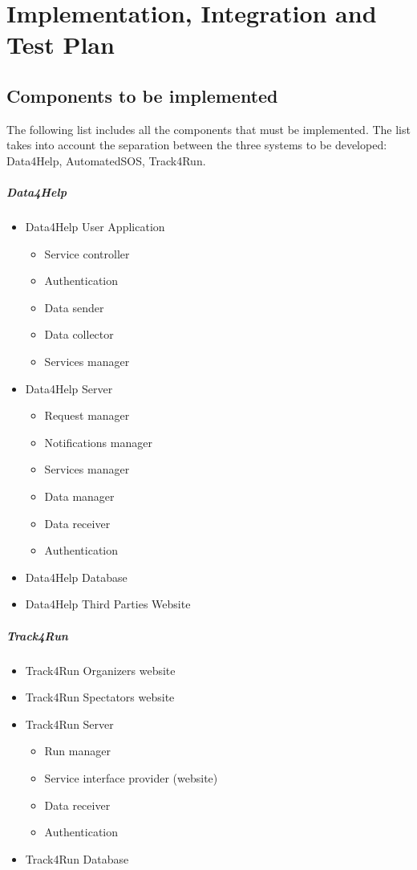 \documentclass[../DD.tex]{subfiles}
\begin{document}
 \chapter{Implementation, Integration and Test Plan}

	\section{Components to be implemented\label{sect:5.1}}
		The following list includes all the components that must be implemented. The list takes into account the separation between the three systems to be developed: Data4Help, AutomatedSOS, Track4Run.
		\paragraph{Data4Help}
		\begin{itemize}
			\item{Data4Help User Application}
				\begin{itemize}
					\item{Service controller}
					\item{Authentication}
					\item{Data sender}
					\item{Data collector}
					\item{Services manager}
				\end{itemize}
			\item{Data4Help Server}
				\begin{itemize}
					\item{Request manager}
					\item{Notifications manager}
					\item{Services manager}
					\item{Data manager}
					\item{Data receiver}
					\item{Authentication}
				\end{itemize}
			\item{Data4Help Database}
			\item{Data4Help Third Parties Website}
		\end{itemize}
		\paragraph{Track4Run}
		\begin{itemize}
			\item{Track4Run Organizers website}
			\item{Track4Run Spectators website}
			\item{Track4Run Server}
				\begin{itemize}
					\item{Run manager}
					\item{Service interface provider (website)}
					\item{Data receiver}
					\item{Authentication}
				\end{itemize}
			\item{Track4Run Database}
		\end{itemize}
\end{document}
